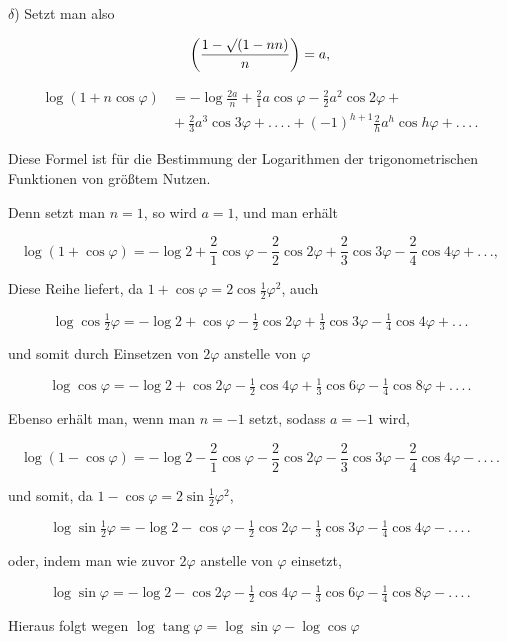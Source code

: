 $\delta$) Setzt man also

\[
\left(\frac{1-\mathord{\surd}(1-nn)}{n}\right) = a,
\]

\[
\begin{aligned}
\log(1+n\cos\varphi) & = -\log\frac{2a}{n} + \frac{2}{1}a\cos\varphi - \frac{2}{2}a^2\cos2\varphi +\\
&{} + \frac{2}{3}a^3\cos3\varphi + .\,.\,.\,. + (-1)^{h+1}\frac{2}{h}a^h\cos h\varphi + .\,.\,.\,.
\end{aligned}
\]

 Diese Formel ist für die Bestimmung der Logarithmen der trigonometrischen
Funktionen von größtem Nutzen.

Denn setzt man $n=1$, so wird $a=1$, und man erhält

\[
\log(1+\cos\varphi) = -\log 2 + \frac{2}{1}\cos\varphi - \frac{2}{2}\cos2\varphi + \frac{2}{3}\cos3\varphi - \frac{2}{4}\cos4\varphi + .\,.\,.,
\]

\noindent Diese Reihe liefert, da $1+\cos\varphi = 2\cos\frac{1}{2}\varphi^2$,
auch

\[
\log\cos\tfrac{1}{2}\varphi = -\log 2 + \cos\varphi - \tfrac{1}{2}\cos2\varphi + \tfrac{1}{3}\cos3\varphi - \tfrac{1}{4}\cos4\varphi + .\,.\,.
\]

\noindent und somit durch Einsetzen von $2\varphi$ anstelle von $\varphi$

\[
\log\cos\varphi = -\log 2 + \cos2\varphi - \tfrac{1}{2}\cos4\varphi + \tfrac{1}{3}\cos6\varphi - \tfrac{1}{4}\cos8\varphi + .\,.\,.\,.
\]

\noindent Ebenso erhält man, wenn man $n=-1$ setzt, sodass $a=-1$ wird,

\[
\log(1-\cos\varphi) = -\log 2 - \frac{2}{1}\cos\varphi - \frac{2}{2}\cos2\varphi - \frac{2}{3}\cos3\varphi - \frac{2}{4}\cos4\varphi - .\,.\,.\,.
\]

\noindent und somit, da $1-\cos\varphi = 2\sin\tfrac{1}{2}\varphi^2$,

\[
\log\sin\tfrac{1}{2}\varphi = -\log 2 - \cos\varphi - \tfrac{1}{2}\cos2\varphi - \tfrac{1}{3}\cos3\varphi - \tfrac{1}{4}\cos4\varphi - .\,.\,.\,.
\]

\noindent oder, indem man wie zuvor $2\varphi$ anstelle von $\varphi$ einsetzt,

\[
\log\sin\varphi = -\log 2 - \cos2\varphi - \tfrac{1}{2}\cos4\varphi - \tfrac{1}{3}\cos6\varphi - \tfrac{1}{4}\cos8\varphi - .\,.\,.\,.
\]

\noindent Hieraus folgt wegen $\log\operatorname{tang}\varphi = \log\sin\varphi - \log\cos\varphi$

